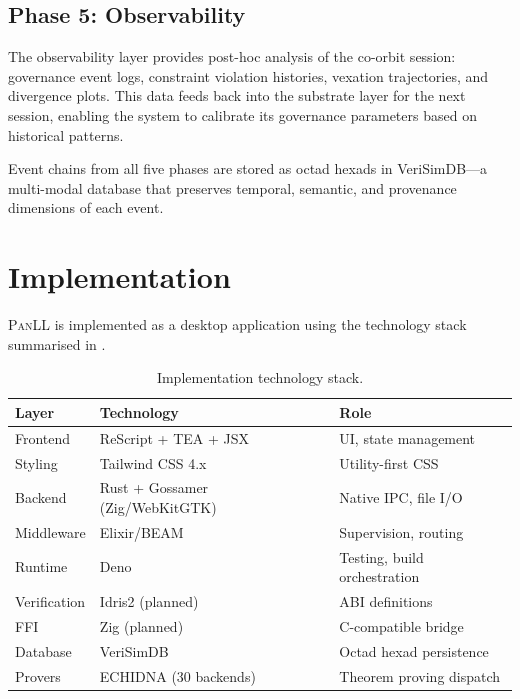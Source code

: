 \documentclass[11pt,a4paper]{article}
\newcommand{\panll}{\textsc{PanLL}}
\newcommand{\tea}{\textsc{TEA}}
\begin{document}
\subsection{Phase 5: Observability}

The observability layer provides post-hoc analysis of the co-orbit
session: governance event logs, constraint violation histories,
vexation trajectories, and divergence plots. This data feeds back
into the substrate layer for the next session, enabling the system
to calibrate its governance parameters based on historical patterns.

Event chains from all five phases are stored as octad hexads in
VeriSimDB---a multi-modal database that preserves temporal,
semantic, and provenance dimensions of each event.

\section{Implementation}\label{sec:implementation}

\panll{} is implemented as a desktop application using the
technology stack summarised in .

\begin{table}[t]
\centering
\caption{Implementation technology stack.}\label{tab:stack}
\begin{tabular}{@{}lll@{}}
\toprule
\textbf{Layer} & \textbf{Technology} & \textbf{Role} \\
\midrule
Frontend & ReScript + \tea{} + JSX & UI, state management \\
Styling & Tailwind CSS 4.x & Utility-first CSS \\
Backend & Rust + Gossamer (Zig/WebKitGTK) & Native IPC, file I/O \\
Middleware & Elixir/BEAM & Supervision, routing \\
Runtime & Deno & Testing, build orchestration \\
Verification & Idris2 (planned) & ABI definitions \\
FFI & Zig (planned) & C-compatible bridge \\
Database & VeriSimDB & Octad hexad persistence \\
Provers & ECHIDNA (30 backends) & Theorem proving dispatch \\
\bottomrule
\end{tabular}
\end{table}
\end{document}
